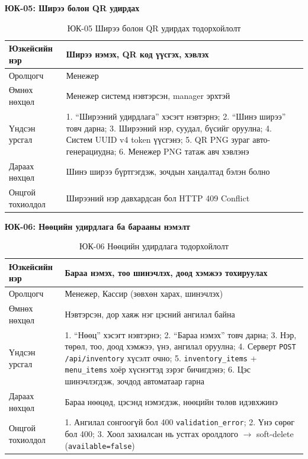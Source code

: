 \textbf{ЮК-05: Ширээ болон QR удирдах}

\begin{table}[htbp]
\caption{ЮК-05 Ширээ болон QR удирдах тодорхойлолт}
\label{tab:uc05}
\centering
\small
\begin{tabularx}{\textwidth}{|L|L|}
\hline
{}
Юзкейсийн нэр & Ширээ нэмэх, QR код үүсгэх, хэвлэх \\ \hline
Оролцогч & Менежер \\ \hline
{}
Өмнөх нөхцөл & Менежер системд нэвтэрсэн, manager эрхтэй \\ \hline
Үндсэн урсгал & 1. ``Ширээний удирдлага'' хэсэгт нэвтэрнэ;
  2. ``Шинэ ширээ'' товч дарна;
  3. Ширээний нэр, суудал, бүсийг оруулна;
  4. Систем UUID v4 token үүсгэнэ;
  5. QR PNG зураг авто-генерациудна;
  6. Менежер PNG татаж авч хэвлэнэ \\ \hline
{}
Дараах нөхцөл & Шинэ ширээ бүртгэгдэж, зочдын хандалтад бэлэн болно \\ \hline
Онцгой тохиолдол & Ширээний нэр давхардсан бол HTTP 409 Conflict \\ \hline
\end{tabularx}
\end{table}

\textbf{ЮК-06: Нөөцийн удирдлага ба барааны нэмэлт}

\begin{table}[htbp]
\caption{ЮК-06 Нөөцийн удирдлага тодорхойлолт}
\label{tab:uc06}
\centering
\small
\begin{tabularx}{\textwidth}{|L|L|}
\hline
{}
Юзкейсийн нэр & Бараа нэмэх, тоо шинэчлэх, доод хэмжээ тохируулах \\ \hline
Оролцогч & Менежер, Кассир (зөвхөн харах, шинэчлэх) \\ \hline
{}
Өмнөх нөхцөл & Нэвтэрсэн, дор хаяж нэг цэсний ангилал байна \\ \hline
Үндсэн урсгал & 1. ``Нөөц'' хэсэгт нэвтэрнэ;
  2. ``Бараа нэмэх'' товч дарна;
  3. Нэр, төрөл, тоо, доод хэмжээ, үнэ, ангилал оруулна;
  4. Серверт \texttt{POST /api/inventory} хүсэлт очно;
  5. \texttt{inventory\_items} + \texttt{menu\_items} хоёр хүснэгтэд зэрэг бичигдэнэ;
  6. Цэс шинэчлэгдэж, зочдод автоматаар гарна \\ \hline
{}
Дараах нөхцөл & Бараа нөөцөд, цэсэнд нэмэгдэж, нөөцийн төлөв идэвхжинэ \\ \hline
Онцгой тохиолдол & 1. Ангилал сонгоогүй бол 400 \texttt{validation\_error};
  2. Үнэ сөрөг бол 400;
  3. Хоол захиалсан нь устгах оролдлого $\to$ soft-delete (\texttt{available=false}) \\ \hline
\end{tabularx}
\end{table}

